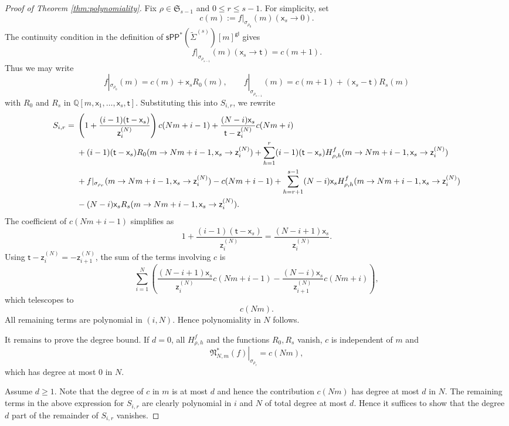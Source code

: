 \documentclass[10pt,a4paper]{amsart}
\newcommand{\sPP}{\mathsf{sPP}}
\newcommand{\spp}{\sPP}
\begin{document}
\begin{proof}[Proof of Theorem \ref{thm:polynomiality}]
	Fix $\rho\in \mathfrak S_{s-1}$ and $0\le r\le s-1$. For simplicity, set
	\[
		c(m):=f|_{\sigma_{\rho_0}}(m)(\mathsf{x}_s\to 0).
	\]
	The continuity condition in the definition of $\spp^{\ast}(\tilde{\Sigma}^{(s)})[m]^{\mathsf{gl}}$ gives
	\[
		f|_{\sigma_{\rho_{s-1}}}(m)(\mathsf{x}_s\to \mathsf{t})=c(m+1).
	\]
	Thus we may write
	\[
		f|_{\sigma_{\rho_0}}(m)=c(m)+\mathsf{x}_sR_0(m),\qquad
		f|_{\sigma_{\rho_{s-1}}}(m)=c(m+1)+(\mathsf{x}_s-\mathsf{t})R_s(m)
	\]
	with $R_0$ and $R_s$ in $\mathbb{Q}[m,\mathsf{x}_1,\dots,\mathsf{x}_s,\mathsf{t}]$. Substituting this into $S_{i,r}$, we rewrite
    {\allowdisplaybreaks
	\begin{align*}
		S_{i,r}={}&\left(1+\frac{(i-1)(\mathsf{t}-\mathsf{x}_s)}{\mathsf{z}_i^{(N)}}\right)c(Nm+i-1)
		+\frac{(N-i)\mathsf{x}_s}{\mathsf{t}-\mathsf{z}_i^{(N)}}c(Nm+i)\\
				  &+(i-1)(\mathsf{t}-\mathsf{x}_s)R_0(m\to Nm+i-1,\mathsf{x}_s\to \mathsf{z}_i^{(N)})
				  +\sum_{h=1}^{r}(i-1)(\mathsf{t}-\mathsf{x}_s)H_{\rho,h}^f(m\to Nm+i-1,\mathsf{x}_s\to \mathsf{z}_i^{(N)})\notag\\
				  &+f|_{\sigma_{\rho_r}}(m\to Nm+i-1,\mathsf{x}_s\to \mathsf{z}_i^{(N)})-c(Nm+i-1)
				  +\sum_{h=r+1}^{s-1}(N-i)\mathsf{x}_sH_{\rho,h}^f(m\to Nm+i-1,\mathsf{x}_s\to \mathsf{z}_i^{(N)})\notag\\
				  &-(N-i)\mathsf{x}_sR_s(m\to Nm+i-1,\mathsf{x}_s\to \mathsf{z}_i^{(N)}).
	\end{align*}}
	The coefficient of $c(Nm+i-1)$ simplifies as
	\[
		1+\frac{(i-1)(\mathsf{t}-\mathsf{x}_s)}{\mathsf{z}_i^{(N)}}=\frac{(N-i+1)\mathsf{x}_s}{\mathsf{z}_i^{(N)}}.
	\]
	Using $\mathsf{t}-\mathsf{z}_i^{(N)}=-\mathsf{z}_{i+1}^{(N)}$, the sum of the terms involving
	$c$ is
	\[
		\sum_{i=1}^N\left(\frac{(N-i+1)\mathsf{x}_s}{\mathsf{z}_i^{(N)}}c(Nm+i-1)
		-\frac{(N-i)\mathsf{x}_s}{\mathsf{z}_{i+1}^{(N)}}c(Nm+i)\right),
	\]
	which telescopes to
	\[
		c(Nm).
	\]
	All remaining terms are polynomial in $(i,N)$. Hence polynomiality in $N$ follows.

	It remains to prove the degree bound. If $d=0$, all $H_{\rho,h}^{f}$ and the functions $R_0,R_s$ vanish, $c$ is independent
	of $m$ and
	\[
		\left.\mathfrak N_{N,m}^\ast(f)\right|_{\sigma_{\rho_r}}=c(Nm),
	\]
	which has degree at most $0$ in $N$.

	Assume $d\ge 1$. Note that the degree of $c$ in $m$ is at most $d$ and hence the contribution $c(Nm)$ has
	degree at most $d$ in $N$. The remaining terms in the above expression for $S_{i,r}$ are clearly polynomial in $i$ and $N$ of total
	degree at most $d$. Hence it suffices to show that the degree $d$ part of the remainder of $S_{i,r}$ vanishes.


\end{proof}
\end{document}
